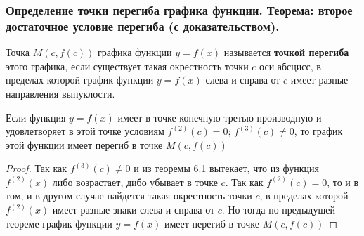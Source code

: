 \documentclass[10pt]{article}
\begin{document}
    \subsubsection{Определение точки перегиба графика функции. Теорема: второе достаточное условие перегиба (с доказательством).}
    \begin{definition}
        Точка $M(c, f(c))$ графика функции $y = f(x)$ называется \textbf{точкой перегиба} этого графика, если существует такая окрестность точки $c$ оси абсцисс, в пределах которой график функции $y = f(x)$ слева и справа от $c$ имеет разные направления выпуклости.
    \end{definition}
    \begin{theorem}
        Если функция $y = f(x)$ имеет в точке конечную третью производную и удовлетворяет в этой точке условиям $f^{(2)}(c) = 0;\,f^{(3)}(c) \neq 0$, то график этой функции имеет перегиб в точке $M(c, f(c))$
    \end{theorem}
    \begin{proof}
        Так как $f^{(3)}(c) \neq 0$ и из теоремы 6.1 вытекает, что из функция $f^{(2)}(x)$ либо возрастает, дибо убывает в точке $c$. Так как $f^{(2)}(c) = 0$, то и в том, и в другом случае найдется такая окрестность точки $c$, в пределах которой $f^{(2)}(x)$ имеет разные знаки слева и справа от $c$. Но тогда по предыдущей теореме график функции $y = f(x)$ имеет перегиб в точке $M(c, f(c))$
    \end{proof}
\end{document}
